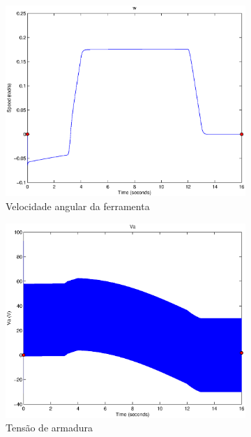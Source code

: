 \documentclass{article}
\begin{document}
\begin{figure}[H]
\begin{subfigure}{0.32\textwidth}
		\includegraphics[width=\linewidth]{matlab/w4}
		\caption{Velocidade angular da ferramenta}
	\end{subfigure}
	\begin{subfigure}{0.32\textwidth}
		\includegraphics[width=\linewidth]{matlab/va4}
		\caption{Tensão de armadura}
	\end{subfigure}
	\begin{subfigure}{0.32\textwidth}

\end{subfigure}
\end{figure}
\end{document}
